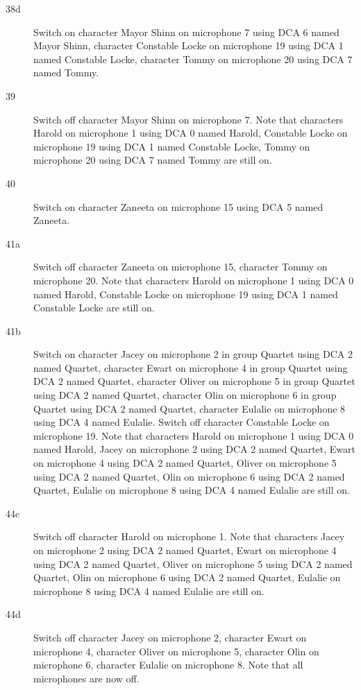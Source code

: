 \begin{description}
\item[38d]
Switch on character Mayor Shinn on microphone 7 using DCA 6 named Mayor Shinn, character Constable Locke on microphone 19 using DCA 1 named Constable Locke, character Tommy on microphone 20 using DCA 7 named Tommy. 

\item[39]
Switch off character Mayor Shinn on microphone 7. Note that characters Harold on microphone 1 using DCA 0 named Harold, Constable Locke on microphone 19 using DCA 1 named Constable Locke, Tommy on microphone 20 using DCA 7 named Tommy are still on.  

\item[40]
Switch on character Zaneeta on microphone 15 using DCA 5 named Zaneeta. 

\item[41a]
Switch off character Zaneeta on microphone 15, character Tommy on microphone 20. Note that characters Harold on microphone 1 using DCA 0 named Harold, Constable Locke on microphone 19 using DCA 1 named Constable Locke are still on.  

\item[41b]
Switch on character Jacey on microphone 2 in group Quartet using DCA 2 named Quartet, character Ewart on microphone 4 in group Quartet using DCA 2 named Quartet, character Oliver on microphone 5 in group Quartet using DCA 2 named Quartet, character Olin on microphone 6 in group Quartet using DCA 2 named Quartet, character Eulalie on microphone 8 using DCA 4 named Eulalie. Switch off character Constable Locke on microphone 19. Note that characters Harold on microphone 1 using DCA 0 named Harold, Jacey on microphone 2 using DCA 2 named Quartet, Ewart on microphone 4 using DCA 2 named Quartet, Oliver on microphone 5 using DCA 2 named Quartet, Olin on microphone 6 using DCA 2 named Quartet, Eulalie on microphone 8 using DCA 4 named Eulalie are still on.  

\item[44c]
Switch off character Harold on microphone 1. Note that characters Jacey on microphone 2 using DCA 2 named Quartet, Ewart on microphone 4 using DCA 2 named Quartet, Oliver on microphone 5 using DCA 2 named Quartet, Olin on microphone 6 using DCA 2 named Quartet, Eulalie on microphone 8 using DCA 4 named Eulalie are still on.  

\item[44d]
Switch off character Jacey on microphone 2, character Ewart on microphone 4, character Oliver on microphone 5, character Olin on microphone 6, character Eulalie on microphone 8. Note that all microphones are now off.


\end{description}

